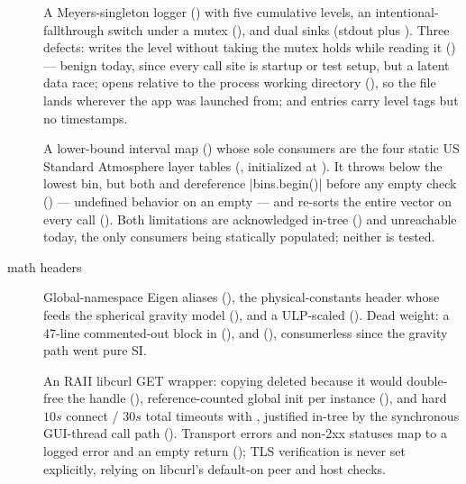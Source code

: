 \begin{description}
\item[] A Meyers-singleton logger () with five
cumulative levels, an intentional-fallthrough switch under a mutex
(), and dual sinks (stdout plus ). Three defects:
 writes the level without taking the mutex  holds while
reading it () --- benign today, since every call site is startup
or test setup, but a latent data race;  opens relative to the process working
directory (), so the file lands wherever the app was launched
from; and entries carry level tags but no timestamps.
\item[] A lower-bound interval map () whose sole consumers
are the four static US Standard Atmosphere layer tables
(, initialized at
). It throws  below the
lowest bin, but both  and  dereference
\cppinline|bins.begin()| before any empty check () --- undefined
behavior on an empty  --- and  re-sorts the entire vector on every
call (). Both limitations are acknowledged in-tree
() and unreachable today, the only consumers being statically
populated; neither is tested.
\item[math headers] Global-namespace Eigen aliases (), the
physical-constants header whose  feeds the spherical gravity model
(), and a ULP-scaled 
(). Dead weight: a 47-line commented-out block
in  (), and
 (), consumerless since the gravity path
went pure SI.
\item[] An RAII libcurl GET wrapper: copying deleted because it would
double-free the handle (), reference-counted global init per
instance (), and hard $10\unit{s}$ connect /
$30\unit{s}$ total timeouts with , justified in-tree by the synchronous
GUI-thread call path (). Transport errors and non-2xx
statuses map to a logged error and an empty return ();
TLS verification is never set explicitly, relying on libcurl's default-on peer and host
checks.
\end{description}

